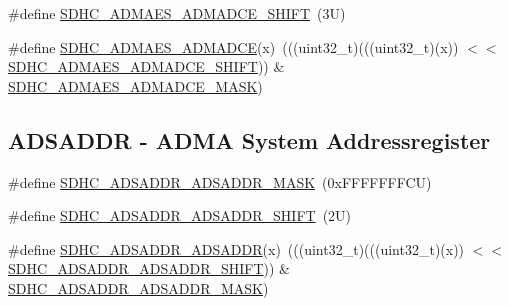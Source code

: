 \begin{DoxyCompactItemize}
\item 
\#define \mbox{\hyperlink{group___s_d_h_c___register___masks_gab96190a44e154d4acd156f0026d4c363}{S\+D\+H\+C\+\_\+\+A\+D\+M\+A\+E\+S\+\_\+\+A\+D\+M\+A\+D\+C\+E\+\_\+\+S\+H\+I\+FT}}~(3\+U)
\item 
\#define \mbox{\hyperlink{group___s_d_h_c___register___masks_ga01da04b3075e0a5b8c296f4253747f60}{S\+D\+H\+C\+\_\+\+A\+D\+M\+A\+E\+S\+\_\+\+A\+D\+M\+A\+D\+CE}}(x)~(((uint32\+\_\+t)(((uint32\+\_\+t)(x)) $<$$<$ \mbox{\hyperlink{group___s_d_h_c___register___masks_gab96190a44e154d4acd156f0026d4c363}{S\+D\+H\+C\+\_\+\+A\+D\+M\+A\+E\+S\+\_\+\+A\+D\+M\+A\+D\+C\+E\+\_\+\+S\+H\+I\+FT}})) \& \mbox{\hyperlink{group___s_d_h_c___register___masks_ga2c0005f89f635749f423284e92025434}{S\+D\+H\+C\+\_\+\+A\+D\+M\+A\+E\+S\+\_\+\+A\+D\+M\+A\+D\+C\+E\+\_\+\+M\+A\+SK}})
\end{DoxyCompactItemize}
\subsection*{A\+D\+S\+A\+D\+DR -\/ A\+D\+MA System Addressregister}
\begin{DoxyCompactItemize}
\item 
\#define \mbox{\hyperlink{group___s_d_h_c___register___masks_gaf351e8cc179a6507219df80133e901dd}{S\+D\+H\+C\+\_\+\+A\+D\+S\+A\+D\+D\+R\+\_\+\+A\+D\+S\+A\+D\+D\+R\+\_\+\+M\+A\+SK}}~(0x\+F\+F\+F\+F\+F\+F\+F\+C\+U)
\item 
\#define \mbox{\hyperlink{group___s_d_h_c___register___masks_ga6bad5e40bfb6829aa79079fa8748a7d1}{S\+D\+H\+C\+\_\+\+A\+D\+S\+A\+D\+D\+R\+\_\+\+A\+D\+S\+A\+D\+D\+R\+\_\+\+S\+H\+I\+FT}}~(2\+U)
\item 
\#define \mbox{\hyperlink{group___s_d_h_c___register___masks_ga4e9df4f22bb72c4482aadfdddc916b5e}{S\+D\+H\+C\+\_\+\+A\+D\+S\+A\+D\+D\+R\+\_\+\+A\+D\+S\+A\+D\+DR}}(x)~(((uint32\+\_\+t)(((uint32\+\_\+t)(x)) $<$$<$ \mbox{\hyperlink{group___s_d_h_c___register___masks_ga6bad5e40bfb6829aa79079fa8748a7d1}{S\+D\+H\+C\+\_\+\+A\+D\+S\+A\+D\+D\+R\+\_\+\+A\+D\+S\+A\+D\+D\+R\+\_\+\+S\+H\+I\+FT}})) \& \mbox{\hyperlink{group___s_d_h_c___register___masks_gaf351e8cc179a6507219df80133e901dd}{S\+D\+H\+C\+\_\+\+A\+D\+S\+A\+D\+D\+R\+\_\+\+A\+D\+S\+A\+D\+D\+R\+\_\+\+M\+A\+SK}})
\end{DoxyCompactItemize}
